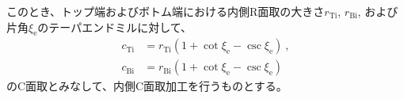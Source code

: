 このとき、トップ端およびボトム端における内側R面取の大きさ$r_\mathrm{Ti}$, $r_\mathrm{Bi}$, および片角$\xi_\mathrm e$のテーパエンドミルに対して、
\begin{align*}
  c_\mathrm{Ti} &= r_\mathrm{Ti}\left(1+\cot\xi_\mathrm e-\csc\xi_\mathrm e\right)\ ,\\
  c_\mathrm{Bi} &= r_\mathrm{Bi}\left(1+\cot\xi_\mathrm e-\csc\xi_\mathrm e\right)
\end{align*}
のC面取とみなして、内側C面取加工を行うものとする。
